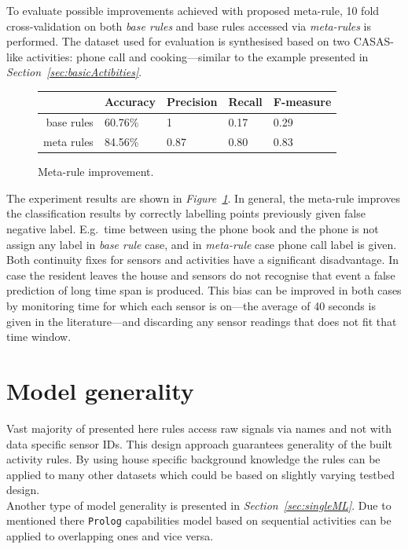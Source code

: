 \documentclass[10pt, a4paper, pdflatex, leqno, twoside, openright]{report}
\begin{document}
To evaluate possible improvements achieved with proposed meta-rule, 10 fold cross-validation on both \emph{base rules} and base rules accessed via \emph{meta-rules} is performed. The dataset used for evaluation is synthesised based on two CASAS-like activities: phone call and cooking---similar to the example presented in \emph{Section~\ref{sec:basicActibities}}.\\

\begin{figure}[htb]
  \centering
  \begin{tabular}{ r | l l l l }
 & Accuracy & Precision & Recall & F-measure\\
\hline
base rules & 60.76\% & 1 & 0.17 & 0.29\\
meta rules & 84.56\% & 0.87 & 0.80 & 0.83 \\
  \end{tabular}
  \caption{Meta-rule improvement.\label{tab:metaImprovement}}
\end{figure}

The experiment results are shown in \emph{Figure~\ref{tab:metaImprovement}}. In general, the meta-rule improves the classification results by correctly labelling points previously given false negative label. E.g.\ time between using the phone book and the phone is not assign any label in \emph{base rule} case, and in \emph{meta-rule} case phone call label is given.\\

Both continuity fixes for sensors and activities have a significant disadvantage. In case the resident leaves the house and sensors do not recognise that event a false prediction of long time span is produced. This bias can be improved in both cases by monitoring time for which each sensor is on---the average of 40 seconds is given in the literature---and discarding any sensor readings that does not fit that time window.

  \section{Model generality}
Vast majority of presented here rules access raw signals via names and not with data specific sensor IDs. This design approach guarantees generality of the built activity rules. By using house specific background knowledge the rules can be applied to many other datasets which could be based on slightly varying testbed design.\\
Another type of model generality is presented in \emph{Section~\ref{sec:singleML}}. Due to mentioned there \texttt{Prolog} capabilities model based on sequential activities can be applied to overlapping ones and vice versa.\\
\end{document}
